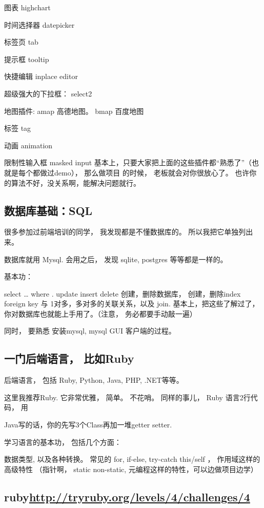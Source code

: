 \documentclass[11pt]{ctexart}
\begin{document}
{{{{图表 highchart

时间选择器 datepicker

标签页 tab

提示框 tooltip

快捷编辑 inplace editor

超级强大的下拉框： select2

地图插件: amap 高德地图。 bmap 百度地图

标签 tag

动画 animation

限制性输入框 masked input
基本上，只要大家把上面的这些插件都“熟悉了”（也就是每个都做过demo）， 那么做项目
的时候， 老板就会对你很放心了。 也许你的算法不好，没关系啊，能解决问题就行。



\subsection{数据库基础：SQL}
\label{sec:orgdee3afc}
很多参加过前端培训的同学， 我发现都是不懂数据库的。 所以我把它单独列出来。

数据库就用 Mysql. 会用之后， 发现 sqlite, postgres 等等都是一样的。

基本功：

select \ldots{} where .
update
insert
delete
创建，删除数据库，
创建，删除index
foreign key 与 1对多，多对多的关联关系，以及 join.
基本上，把这些了解过了， 你对数据库也就能上手用了。（注意， 务必都要手动敲一遍）


同时， 要熟悉 安装mysql, mysql GUI 客户端的过程。

\subsection{一门后端语言， 比如Ruby}
\label{sec:org029794f}
后端语言， 包括 Ruby, Python, Java, PHP, .NET等等。

这里我推荐Ruby. 它非常优雅， 简单。 不花哨。 同样的事儿， Ruby 语言2行代码， 用

Java写的话，你的先写3个Class再加一堆getter setter.


学习语言的基本功， 包括几个方面：

数据类型, 以及各种转换。
常见的 for, if-else, try-catch
this/self ， 作用域这样的高级特性
（指针啊， static non-static, 元编程这样的特性，可以边做项目边学）
\subsection{ruby\url{http://tryruby.org/levels/4/challenges/4}}
\label{sec:org298d35a}
}}}}
\end{document}
